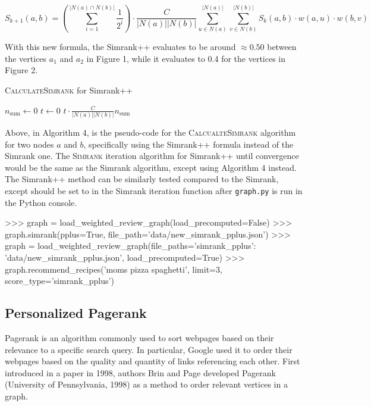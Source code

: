 \documentclass[fontsize=11pt]{article}
\begin{document}
\[
S_{k+1}(a, b) = \left(\sum_{i=1}^{\lvert N(a) \cap N(b) \rvert}\frac{1}{2^i}\right) \cdot \frac{C}{\lvert N(a) \rvert \lvert N(b) \rvert} \sum^{\lvert N(a) \rvert}_{u \in N(a)} \sum^{\lvert N(b) \rvert}_{v \in N(b)} S_k(a, b) \cdot w(a, u) \cdot w(b, v)
\]

With this new formula, the Simrank++ evaluates to be around $\approx 0.50$ between the vertices $a_1$ and $a_2$ in Figure 1, while it evaluates to 0.4 for the vertices in Figure 2. 

\begin{algorithm}[H]
    \setcounter{AlgoLine}{0}
    \caption{\textsc{CalculateSimrank} for Simrank++}
    $n_{\text{sum}} \gets 0$\;
    $t \gets 0$\;
    \Return $t \cdot \frac{C}{\lvert N(a) \rvert \lvert N(b) \rvert} n_{\text{sum}}$\;
\end{algorithm}

Above, in Algorithm 4, is the pseudo-code for the \textsc{CalcualteSimrank} algorithm for two nodes $a$ and $b$, specifically using the Simrank++ formula instead of the Simrank one. The \textsc{Simrank} iteration algorithm for Simrank++ until convergence would be the same as the Simrank algorithm, except using Algorithm 4 instead. The Simrank++ method can be similarly tested compared to the Simrank, except  should be set to  in the Simrank iteration function after \texttt{graph.py} is run in the Python console.

\begin{python}
>>> graph = load_weighted_review_graph(load_precomputed=False)
>>> graph.simrank(pplus=True, file_path='data/new_simrank_pplus.json')
>>> graph = load_weighted_review_graph(file_paths={'simrank_pplus': 'data/new_simrank_pplus.json'}, load_precomputed=True)
>>> graph.recommend_recipes('moms pizza spaghetti', limit=3, score_type='simrank_pplus')
\end{python}

\subsection{Personalized Pagerank}
Pagerank is an algorithm commonly used to sort webpages based on their relevance to a specific search query. In particular, Google used it to order their webpages based on the quality and quantity of links referencing each other. First introduced in a paper in 1998, authors Brin and Page developed Pagerank (University of Pennsylvania, 1998) as a method to order relevant vertices in a graph. 
\end{document}
